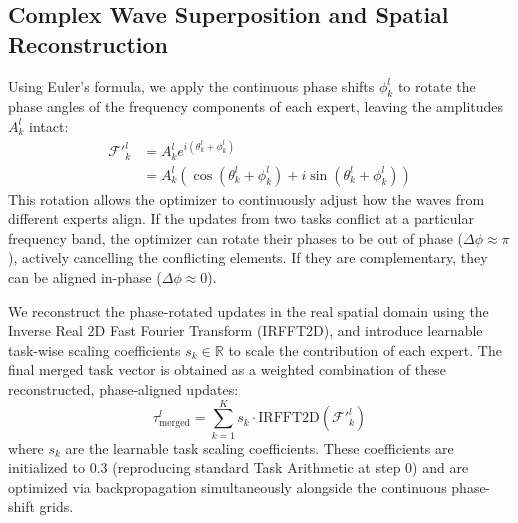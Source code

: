 \subsection{Complex Wave Superposition and Spatial Reconstruction}
Using Euler's formula, we apply the continuous phase shifts $\phi_k^l$ to rotate the phase angles of the frequency components of each expert, leaving the amplitudes $A_k^l$ intact:
\begin{align}
    \mathcal{F}'^l_k &= A_k^l e^{i (\theta_k^l + \phi_k^l)} \\
    &= A_k^l \left( \cos(\theta_k^l + \phi_k^l) + i \sin(\theta_k^l + \phi_k^l) \right)
\end{align}
This rotation allows the optimizer to continuously adjust how the waves from different experts align. If the updates from two tasks conflict at a particular frequency band, the optimizer can rotate their phases to be out of phase ($\Delta \phi \approx \pi$), actively cancelling the conflicting elements. If they are complementary, they can be aligned in-phase ($\Delta \phi \approx 0$).

We reconstruct the phase-rotated updates in the real spatial domain using the Inverse Real 2D Fast Fourier Transform (IRFFT2D), and introduce learnable task-wise scaling coefficients $s_k \in \mathbb{R}$ to scale the contribution of each expert. The final merged task vector is obtained as a weighted combination of these reconstructed, phase-aligned updates:
\begin{equation}
    \tau^l_{\text{merged}} = \sum_{k=1}^K s_k \cdot \text{IRFFT2D}(\mathcal{F}'^l_k)
\end{equation}
where $s_k$ are the learnable task scaling coefficients. These coefficients are initialized to $0.3$ (reproducing standard Task Arithmetic at step 0) and are optimized via backpropagation simultaneously alongside the continuous phase-shift grids. 

